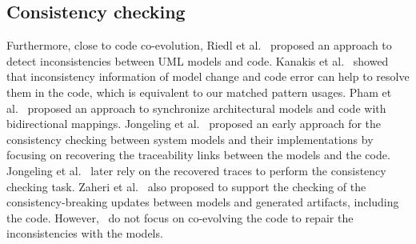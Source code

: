  \subsection{Consistency checking }
 \label{Consistency_checking}
 Furthermore, close to code co-evolution, Riedl et al.~\cite{riedl2014towards} proposed an approach to detect inconsistencies between UML models and code. Kanakis et al.~\cite{kanakis2019empirical} showed that inconsistency information of model change and code error can help to resolve them in the code, which is equivalent to our matched pattern usages. 
 Pham et al.~\cite{pham2017bidirectional} proposed an approach to synchronize architectural models and code with bidirectional mappings.
 Jongeling et al.~\cite{jongeling2020towards} proposed an early approach for the consistency checking between system models and their implementations by focusing on recovering the traceability links between the models and the code. Jongeling et al.~\cite{jongeling2022Structural} later rely on the recovered traces to perform the consistency checking task.  %
 Zaheri et al.~\cite{zaheri2021towards} also proposed to support the checking of the consistency-breaking updates between models and generated artifacts, including the code. However,~\cite{pham2017bidirectional,jongeling2020towards,jongeling2022Structural,zaheri2021towards} do not focus on co-evolving the code to repair the inconsistencies with the models. 
 



